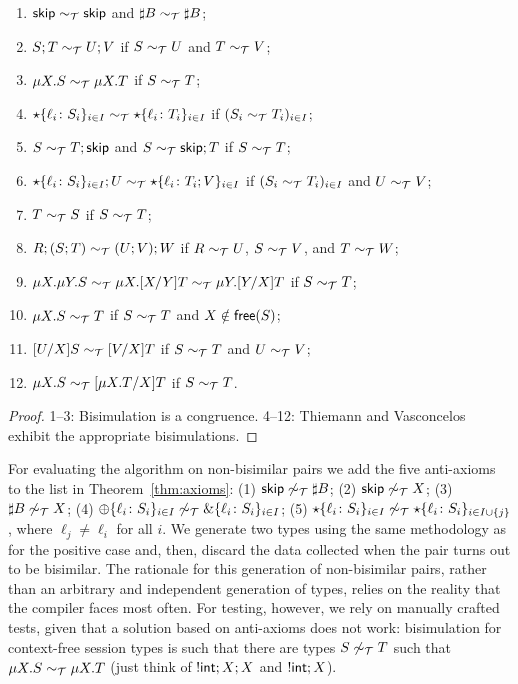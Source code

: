 \begin{theorem}
\label{thm:axioms}
  \begin{enumerate}
  \item $\mathsf{skip} \sim_\mathcal T \mathsf{skip}$ and $\sharp B \sim_\mathcal T \sharp B$;
  \item $S;T \sim_\mathcal T U;V$ if $S \sim_\mathcal T U$ and $T \sim_\mathcal T V$;
  \item $\mu X.S \sim_\mathcal T \mu X.T$ if $S \sim_\mathcal T T$;
  \item $\star\{\ell_i\colon S_i\}_{i\in I}\sim_\mathcal T
    \star\{\ell_i\colon T_i\}_{i\in I}$ if $(S_i \sim_\mathcal T T_i)_{i\in
      I}$;
  \item $S\sim_\mathcal T T;\mathsf{skip}$ and $S\sim_\mathcal T \mathsf{skip};T$ if $S \sim_\mathcal T T$;
  \item $\star\{\ell_i\colon S_i\}_{i\in I};U\sim_\mathcal T
    \star\{\ell_i\colon T_i;V\}_{i\in I}$ if $(S_i \sim_\mathcal T T_i)_{i\in
      I}$ and $U \sim_\mathcal T V$;
  \item $T \sim_\mathcal T S$ if $S \sim_\mathcal T T$;
  \item $R;(S;T) \sim_\mathcal T (U;V);W$ if $R \sim_\mathcal T U$, $S \sim_\mathcal T V$, and $T\sim_\mathcal T W$;
  \item
    $\mu X.\mu Y.S \sim_\mathcal T \mu X.[{X}/{Y}]T \sim_\mathcal T \mu Y.[{Y}/{X}]T$ if $S \sim_\mathcal T T$;
  \item $\mu X.S \sim_\mathcal T T$ if $S \sim_\mathcal T T$ and $X\notin\mathsf{free}(S)$;
  \item $[{U}/{X}]S\sim_\mathcal T [{V}/{X}]T$  if $S \sim_\mathcal T T$ and $U \sim_\mathcal T V$;
  \item $\mu X.S \sim_\mathcal T [{\mu X.T}/{X}]T$ if $S \sim_\mathcal T T$.
  \end{enumerate}
\end{theorem}
%
\begin{proof}
  1--3: Bisimulation is a congruence. 4--12: Thiemann and
  Vasconcelos~\cite{thiemann2016context} exhibit the appropriate
  bisimulations.
\end{proof}

For evaluating the algorithm on non-bisimilar pairs we add the 
five anti-axioms to the list in Theorem~\ref{thm:axioms}:
(1) $\mathsf{skip} \not\sim_\mathcal T \sharp B$; \enspace
(2) $\mathsf{skip} \not\sim_\mathcal T X$; \enspace
(3) $\sharp B \not\sim_\mathcal T X$; \enspace
(4) $\oplus\{\ell_i\colon S_i\}_{i\in I} \not\sim_\mathcal T \&\{\ell_i\colon S_i\}_{i\in I}$; \enspace
(5) $\star\{\ell_i\colon S_i\}_{i\in I} \not\sim_\mathcal T \star\{\ell_i\colon S_i\}_{i\in I\cup\{j\}}$,
	where $\ell_j \neq \ell_i$ for all $i$.
%
We generate two types using the same methodology as for the positive case and, 
then, discard the
data collected when the pair turns out to be
bisimilar.
The rationale for this generation of non-bisimilar pairs, rather than
an arbitrary and independent generation of types, relies on the reality that 
the compiler faces most often.
For testing, however, we rely on manually crafted tests, given that a
solution based on anti-axioms does not work:
bisimulation for
context-free session types is such that there are types
$S \not\sim_\mathcal T T$ such that $\mu X.S \sim_\mathcal T \mu X.T$ (just think of
$!\mathsf{int};X;X$ and $!\mathsf{int};X$).


